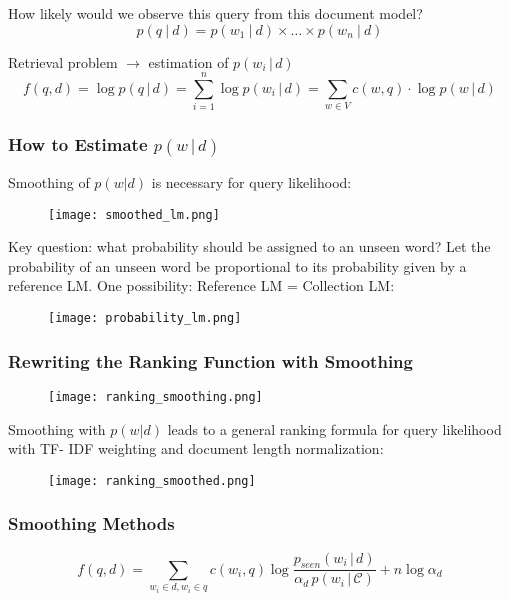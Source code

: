 How likely would we observe this query from this document model?
\begin{equation*}
p(q \:\big|\: d) = p(w_1 \:\big|\: d) \times \dots \times p(w_n \:\big|\: d)
\end{equation*}

Retrieval problem $\to$ estimation of $p(w_i \,\big|\, d)$
\begin{equation*}
f(q, d) = \log p(q \,\big|\, d) = \sum_{i=1}^{n} \log p(w_i \,\big|\, d) = \sum_{w \in V} c(w, q) \cdot \log p(w \,\big|\, d)
\end{equation*}

\subsubsection{How to Estimate $p(w \,\big|\, d)$}
Smoothing of $p(w \big| d)$ is necessary for query likelihood:
\begin{figure}[H]
    \centering
    \texttt{[image: smoothed\_lm.png]}
\end{figure}

Key question: what probability should be assigned to an unseen word? Let the probability of an unseen word be proportional to its probability given by a reference LM. One possibility: Reference LM = Collection LM:
\begin{figure}[H]
    \centering
    \texttt{[image: probability\_lm.png]}
\end{figure}

\subsubsection{Rewriting the Ranking Function with Smoothing}
\begin{figure}[H]
    \centering
    \texttt{[image: ranking\_smoothing.png]}
\end{figure}

Smoothing with $p(w \big| d)$ leads to a general ranking formula for query likelihood with TF- IDF weighting and document length normalization:
\begin{figure}[H]
    \centering
    \texttt{[image: ranking\_smoothed.png]}
\end{figure}

\subsubsection{Smoothing Methods}
\begin{equation*}
f(q, d) = \sum_{w_i \in d, w_i \in q} c(w_i, q) \log \frac{p_{seen}(w_i \,\big|\, d)}{\alpha_d \, p(w_i \,\big|\, \mathcal{C})} + n \log \alpha_d
\end{equation*}


